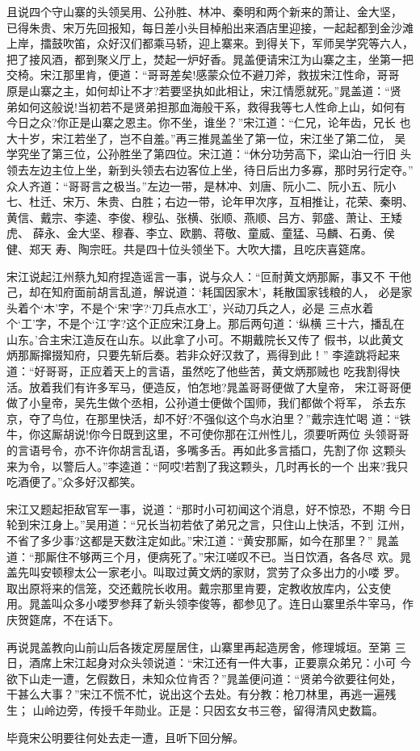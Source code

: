 且说四个守山寨的头领吴用、公孙胜、林冲、秦明和两个新来的萧让、金大坚，
已得朱贵、宋万先回报知，每日差小头目棹船出来酒店里迎接，一起起都到金沙滩
上岸，擂鼓吹笛，众好汉们都乘马轿，迎上寨来。到得关下，军师吴学究等六人，
把了接风酒，都到聚义厅上，焚起一炉好香。晁盖便请宋江为山寨之主，坐第一把
交椅。宋江那里肯，便道：“哥哥差矣!感蒙众位不避刀斧，救拔宋江性命，哥哥
原是山寨之主，如何却让不才?若要坚执如此相让，宋江情愿就死。”晁盖道：“贤
弟如何这般说!当初若不是贤弟担那血海般干系，救得我等七人性命上山，如何有
今日之众?你正是山寨之恩主。你不坐，谁坐？”宋江道：“仁兄，论年齿，兄长
也大十岁，宋江若坐了，岂不自羞。”再三推晁盖坐了第一位，宋江坐了第二位，
吴学究坐了第三位，公孙胜坐了第四位。宋江道：“休分功劳高下，梁山泊一行旧
头领去左边主位上坐，新到头领去右边客位上坐，待日后出力多寡，那时另行定夺。”
众人齐道：“哥哥言之极当。”左边一带，是林冲、刘唐、阮小二、阮小五、阮小
七、杜迁、宋万、朱贵、白胜；右边一带，论年甲次序，互相推让，花荣、秦明、
黄信、戴宗、李逵、李俊、穆弘、张横、张顺、燕顺、吕方、郭盛、萧让、王矮虎、
薛永、金大坚、穆春、李立、欧鹏、蒋敬、童威、童猛、马麟、石勇、侯健、郑天
寿、陶宗旺。共是四十位头领坐下。大吹大擂，且吃庆喜筵席。

宋江说起江州蔡九知府捏造谣言一事，说与众人：“叵耐黄文炳那厮，事又不
干他己，却在知府面前胡言乱道，解说道：‘耗国因家木’，耗散国家钱粮的人，
必是家头着个‘木’字，不是个‘宋’字?‘刀兵点水工’，兴动刀兵之人，必是
三点水着个‘工’字，不是个‘江’字?这个正应宋江身上。那后两句道：‘纵横
三十六，播乱在山东。’合主宋江造反在山东。以此拿了小可。不期戴院长又传了
假书，以此黄文炳那厮撺掇知府，只要先斩后奏。若非众好汉救了，焉得到此！”
李逵跳将起来道：“好哥哥，正应着天上的言语，虽然吃了他些苦，黄文炳那贼也
吃我割得快活。放着我们有许多军马，便造反，怕怎地?晁盖哥哥便做了大皇帝，
宋江哥哥便做了小皇帝，吴先生做个丞相，公孙道士便做个国师，我们都做个将军，
杀去东京，夺了鸟位，在那里快活，却不好?不强似这个鸟水泊里？”戴宗连忙喝
道：“铁牛，你这厮胡说!你今日既到这里，不可使你那在江州性儿，须要听两位
头领哥哥的言语号令，亦不许你胡言乱语，多嘴多舌。再如此多言插口，先割了你
这颗头来为令，以警后人。”李逵道：“阿哎!若割了我这颗头，几时再长的一个
出来?我只吃酒便了。”众多好汉都笑。

宋江又题起拒敌官军一事，说道：“那时小可初闻这个消息，好不惊恐，不期
今日轮到宋江身上。”吴用道：“兄长当初若依了弟兄之言，只住山上快活，不到
江州，不省了多少事?这都是天数注定如此。”宋江道：“黄安那厮，如今在那里？”
晁盖道：“那厮住不够两三个月，便病死了。”宋江嗟叹不已。当日饮酒，各各尽
欢。晁盖先叫安顿穆太公一家老小。叫取过黄文炳的家财，赏劳了众多出力的小喽
罗。取出原将来的信笼，交还戴院长收用。戴宗那里肯要，定教收放库内，公支使
用。晁盖叫众多小喽罗参拜了新头领李俊等，都参见了。连日山寨里杀牛宰马，作
庆贺筵席，不在话下。

再说晁盖教向山前山后各拨定房屋居住，山寨里再起造房舍，修理城垣。至第
三日，酒席上宋江起身对众头领说道：“宋江还有一件大事，正要禀众弟兄：小可
今欲下山走一遭，乞假数日，未知众位肯否？”晁盖便问道：“贤弟今欲要往何处，
干甚么大事？”宋江不慌不忙，说出这个去处。有分教：枪刀林里，再逃一遍残生；
山岭边旁，传授千年勋业。正是：只因玄女书三卷，留得清风史数篇。

毕竟宋公明要往何处去走一遭，且听下回分解。